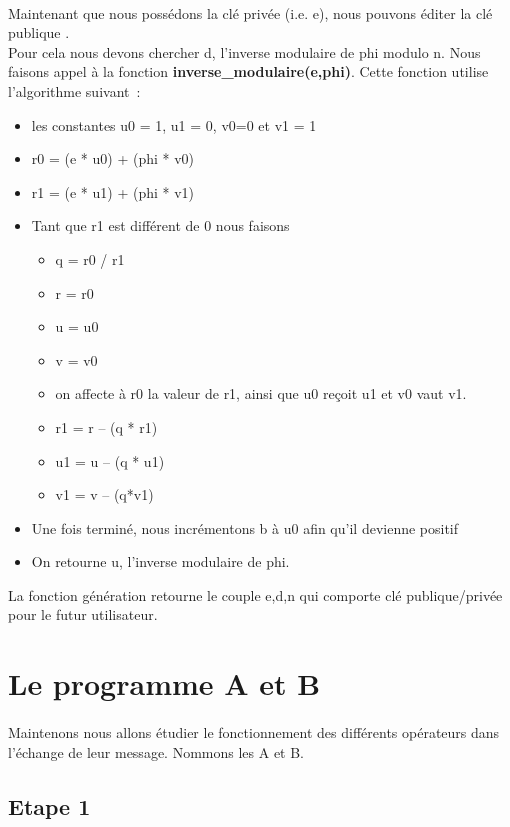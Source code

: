 \documentclass[11pt,fleqn]{book} %
\begin{document}
\\Maintenant que nous possédons la clé privée (i.e. e), nous pouvons éditer la clé publique	.
\\Pour cela nous devons chercher d, l'inverse modulaire de phi modulo n. Nous faisons appel à la fonction \textbf{inverse\_modulaire(e,phi)}. Cette fonction utilise l’algorithme suivant :
\begin{itemize}
\item les constantes u0 = 1, u1 = 0, v0=0 et v1 = 1
\item r0 = (e * u0) + (phi * v0)
\item r1 = (e * u1) + (phi * v1)
\item Tant que r1 est différent de 0 nous faisons
	\begin{itemize}
	\item q = r0 / r1
	\item r = r0
	\item u = u0
	\item v = v0
	\item on affecte à r0 la valeur de r1, ainsi que u0 reçoit u1 et v0 vaut v1.
	\item r1 = r – (q * r1)
	\item u1 = u – (q * u1)
	\item v1 = v – (q*v1)
	\end{itemize}

\item Une fois terminé,  nous incrémentons b à u0 afin qu'il devienne positif
\item On retourne u, l'inverse modulaire de phi.
\end{itemize}
\vspace{0.5cm}La fonction génération retourne le couple e,d,n qui comporte clé publique/privée pour le futur utilisateur.


\section{Le programme A et B}
\paragraph{}Maintenons nous allons étudier le fonctionnement des différents opérateurs dans l'échange de leur message. Nommons les A et B. 
\subsection{Etape 1}
\end{document}

